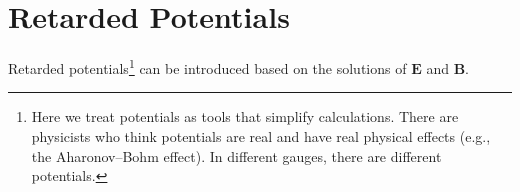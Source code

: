 \documentclass[11pt]{article}              %
\begin{document}



\section[Retarded Potentials]{Retarded Potentials
   }\label{sectionRetardedPotentials}
Retarded potentials\footnote{Here we treat potentials as tools that simplify calculations. There are physicists who think potentials are real and have real physical effects (e.g., the Aharonov–Bohm effect). In different gauges, there are different potentials.} can be introduced based on the solutions of ${\mathbf E}$ and ${\mathbf B}$.
\end{document}
